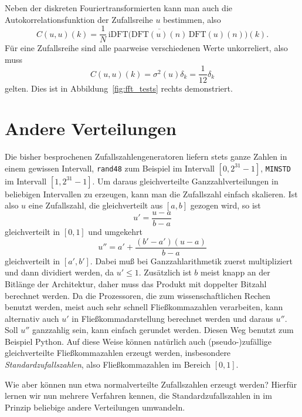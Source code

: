 Neben der diskreten Fouriertransformierten kann man auch die
Autokorrelationsfunktion der Zufallsreihe $u$ bestimmen, also
\begin{equation}
  C(u,u)(k) = \frac{1}{N}\,\text{iDFT}
  \bigl(\overline{\text{DFT}(u)(n)}\,\text{DFT}(u)(n)\bigr)(k).
\end{equation}
Für eine Zufallsreihe sind alle paarweise verschiedenen Werte
unkorreliert, also muss
\begin{equation}
  C(u,u)(k) = \sigma^2(u)\delta_k = \frac{1}{12}\delta_k
\end{equation}
gelten. Dies ist in Abbildung~\ref{fig:fft_tests} rechts
demonstriert.

\section{Andere Verteilungen}

Die bisher besprochenen Zufallszahlengeneratoren liefern stets ganze
Zahlen in einem gewissen Intervall, \texttt{rand48} zum Beispiel
im Intervall $[0,2^{31}-1]$, \texttt{MINSTD} im Intervall
$[1,2^{31}-1]$. Um daraus gleichverteilte Ganzzahlverteilungen in
beliebigen Intervallen zu erzeugen, kann man die Zufallszahl einfach
skalieren. Ist also $u$ eine Zufallszahl, die gleichverteilt aus
$[a,b]$ gezogen wird, so ist
\begin{equation}
  u' = \frac{u - a}{b-a}
\end{equation}
gleichverteilt in $[0,1]$ und umgekehrt
\begin{equation}
  u'' = a' + \frac{(b'-a')(u - a)}{b-a}
\end{equation}
gleichverteilt in $[a',b']$. Dabei muß bei Ganzzahlarithmetik zuerst
multipliziert und dann dividiert werden, da $u' \le 1$. Zusätzlich ist
$b$ meist knapp an der Bitlänge der Architektur, daher muss das
Produkt mit doppelter Bitzahl berechnet werden. Da die Prozessoren,
die zum wissenschaftlichen Rechen benutzt werden, meist auch sehr
schnell Fließkommazahlen verarbeiten, kann alternativ auch $u'$ in
Fließkommadarstellung berechnet werden und daraus $u''$. Soll $u''$
ganzzahlig sein, kann einfach gerundet werden. Diesen Weg benutzt zum
Beispiel Python. Auf diese Weise können natürlich auch
(pseudo-)zufällige gleichverteilte Fließkommazahlen erzeugt werden,
insbesondere \emph{Standardzufallszahlen},
also Fließkommazahlen im Bereich $[0,1]$.

Wie aber können nun etwa normalverteilte Zufallszahlen erzeugt werden?
Hierfür lernen wir nun mehrere Verfahren kennen, die
Standardzufallszahlen in im Prinzip beliebige andere Verteilungen
umwandeln.

